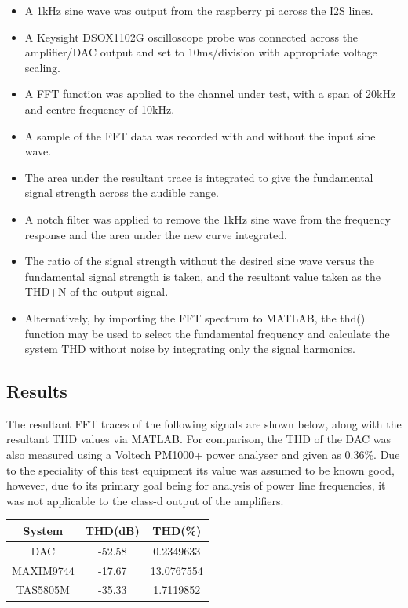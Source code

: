 \documentclass[main.tex]{subfiles}
\begin{document}
\begin{itemize}
    \item A 1kHz sine wave was output from the raspberry pi across the I2S lines.
    \item A Keysight DSOX1102G oscilloscope probe was connected across the amplifier/DAC output and set to 10ms/division with appropriate voltage scaling.
	\item A FFT function was applied to the channel under test, with a span of 20kHz and centre frequency of 10kHz.
	\item A sample of the FFT data was recorded with and without the input sine wave.
	\item The area under the resultant trace is integrated to give the fundamental signal strength across the audible range.
	\item A notch filter was applied to remove the 1kHz sine wave from the frequency response and the area under the new curve integrated.
	\item The ratio of the signal strength without the desired sine wave versus the fundamental signal strength is taken, and the resultant value taken as the THD+N of the output signal.
	\item Alternatively, by importing the FFT spectrum to MATLAB, the thd() function may be used to select the fundamental frequency and calculate the system THD without noise by integrating only the signal harmonics. 
\end{itemize}


\subsection{Results}

The resultant FFT traces of the following signals are shown below, along with the resultant THD values via MATLAB. For comparison, the THD of the DAC was also measured using a Voltech PM1000+ power analyser and given as 0.36\%. Due to the speciality of this test equipment its value was assumed to be known good, however, due to its primary goal being for analysis of power line frequencies, it was not applicable to the class-d output of the amplifiers.
\par

\begin{center}
\begin{tabular}{c|c|c}
    System & THD(dB) & THD(\%) \\
    \hline
    DAC & -52.58 & 0.2349633 \\
    MAXIM9744 & -17.67 & 13.0767554 \\
    TAS5805M & -35.33 & 1.7119852 \\
\end{tabular}
\end{center}
\end{document}

